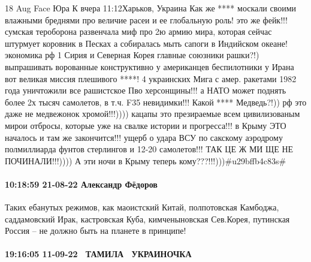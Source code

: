 18 Aug
Face
Юра К
вчера 11:12Харьков, Украина
Как же **** москали своими влажными бреднями про величие расеи и ее глобальную роль! это же фейк!!!
сумская тероборона развенчала миф про 2ю армию мира, которая сейчас штурмует коровник в Песках а собиралась мыть сапоги в Индийском океане! экономика рф 1%
Сирия и Северная Корея главные союзники рашки?!) выпрашивать ворованные конструктивно у американцев беспилотники у Ирана вот великая миссия плешивого ****!
4 украинских Мига с амер. ракетами 1982 года уничтожили все рашистское Пво херсонщины!!! а НАТО может поднять более 2х тысяч самолетов, в т.ч. F35 невидимки!!! Какой **** Медведь?!)) рф это даже не медвежонок хромой!!!)))) кацапы это презираемые всем цивилизованым мирои отбросы, которые уже на свалке истории и прогресса!!!
в Крыму ЭТО началось и там же закончится!!! ущерб о удара ВСУ по сакскому аэродрому полмиллиарда фунтов стерлингов и 12-20 самолетов!!! ТАК ЦЕ Ж МИ ЩЕ НЕ ПОЧИНАЛИ!!!))))
А эти ночи в Крыму теперь кому???!!!)))#u29bffb4c83s#

\paragraph{10:18:59 21-08-22 Александр Фёдоров}

Таких ебанутых режимов, как маоистский Китай, полпотовская Камбоджа,
саддамовский Ирак, кастровская Куба, кимченыновская Сев.Корея, путинская Россия
-- не должно быть на планете в принципе!

\paragraph{19:16:05 11-09-22 💙💛ТАМИЛА 💙💛УКРАИНОЧКА 💙💛}

